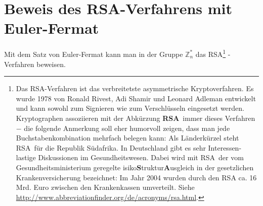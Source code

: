 \begin{refsegment}







\clearpage
\newpage
\hypertarget{RSABeweis}{}
\section{Beweis des RSA-Verfahrens mit Euler-Fermat}
\label{rsabeweis}
Mit dem Satz von Euler-Fermat kann man in der Gruppe $\mathbb{Z}_n^*$ das
RSA\footnote{%
  Das RSA-Verfahren ist das verbreitetste asymmetrische
   Kryptoverfahren. Es wurde 1978 von Ronald
  Rivest, Adi Shamir und Leonard Adleman entwickelt und kann sowohl zum Signieren
  wie zum Verschlüsseln eingesetzt werden.
  Kryptographen assoziieren mit der Abkürzung \glqq \textbf{RSA}\grqq~immer dieses
  Verfahren $-$ die folgende Anmerkung soll eher humorvoll zeigen, dass man
  jede Buchstabenkombination mehrfach belegen kann: Als Länderkürzel steht
  \glqq RSA\grqq~für die Republik Südafrika. In Deutschland gibt es sehr
  Interessen-lastige Diskussionen im Gesundheitswesen. Dabei wird mit
  \glqq RSA\grqq~der vom Gesundheitsministerium geregelte
  \mbox{isiko{\bf S}truktur{\bf A}usgleich\grqq} in der gesetzlichen
  Krankenversicherung bezeichnet: Im Jahr 2004 wurden durch den RSA ca. 16 Mrd. Euro
  zwischen den Krankenkassen umverteilt. Siehe \url{http://www.abbreviationfinder.org/de/acronyms/rsa.html}.
}%
-Verfahren \glqq beweisen\grqq.



\end{refsegment}
